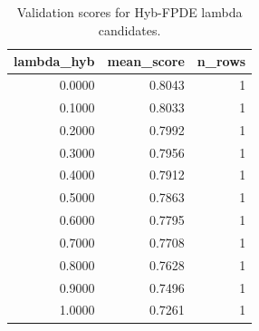 \begin{table}[t]
\caption{Validation scores for Hyb-FPDE lambda candidates.}
\label{tab:lambda_distribution_computed}
\centering
\begin{tabular}{rrr}
\toprule
lambda\_hyb & mean\_score & n\_rows \\
\midrule
0.0000 & 0.8043 & 1 \\
0.1000 & 0.8033 & 1 \\
0.2000 & 0.7992 & 1 \\
0.3000 & 0.7956 & 1 \\
0.4000 & 0.7912 & 1 \\
0.5000 & 0.7863 & 1 \\
0.6000 & 0.7795 & 1 \\
0.7000 & 0.7708 & 1 \\
0.8000 & 0.7628 & 1 \\
0.9000 & 0.7496 & 1 \\
1.0000 & 0.7261 & 1 \\
\bottomrule
\end{tabular}

\end{table}
